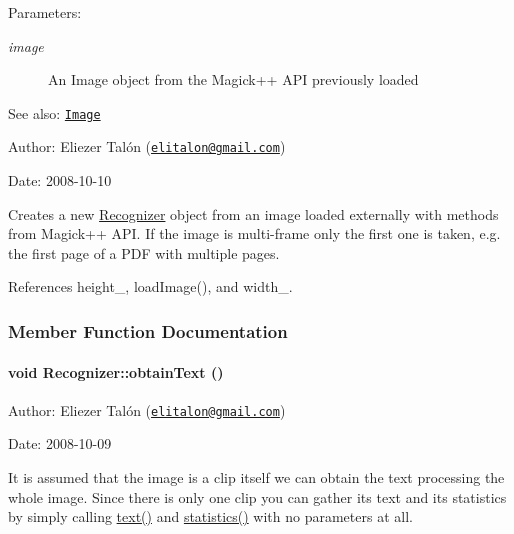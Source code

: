 \begin{Desc}
\item[Parameters:]
\begin{description}
\item[{\em image}]An Image object from the Magick++ API previously loaded\end{description}
\end{Desc}
\begin{Desc}
\item[See also:]\href{http://www.imagemagick.org/Magick++/Image.html}{\tt Image}\end{Desc}
\begin{Desc}
\item[Author:]Eliezer Talón (\href{mailto:elitalon@gmail.com}{\tt elitalon@gmail.com}) \end{Desc}
\begin{Desc}
\item[Date:]2008-10-10\end{Desc}
Creates a new \hyperlink{class_recognizer}{Recognizer} object from an image loaded externally with methods from Magick++ API. If the image is multi-frame only the first one is taken, e.g. the first page of a PDF with multiple pages. 

References height\_\-, loadImage(), and width\_\-.

\subsubsection{Member Function Documentation}
\hypertarget{class_recognizer_008a0ea69a912ff54882dd20d18adcf9}{
\paragraph[obtainText]{\setlength{\rightskip}{0pt plus 5cm}void Recognizer::obtainText ()}\hfill}
\label{class_recognizer_008a0ea69a912ff54882dd20d18adcf9}


\begin{Desc}
\item[Author:]Eliezer Talón (\href{mailto:elitalon@gmail.com}{\tt elitalon@gmail.com}) \end{Desc}
\begin{Desc}
\item[Date:]2008-10-09\end{Desc}
It is assumed that the image is a clip itself we can obtain the text processing the whole image. Since there is only one clip you can gather its text and its statistics by simply calling \hyperlink{class_recognizer_c5d20b511888a60a6c1a81c0a4206ec2}{text()} and \hyperlink{class_recognizer_8b38356d2741969e67cd6b4f507897ba}{statistics()} with no parameters at all. 

